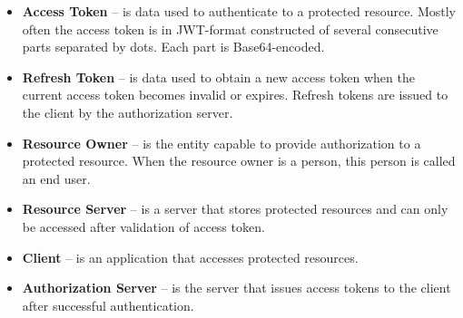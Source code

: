 \begin{itemize}
    \item \textbf{Access Token} -- is data used to authenticate to a protected resource.
    Mostly often the access token is in JWT-format constructed of several
    consecutive parts separated by dots.
    Each part is Base64-encoded.
    \item \textbf{Refresh Token} -- is data used to obtain a new access token when the current access token becomes invalid or expires.
    Refresh tokens are issued to the client by the authorization server.
    \item \textbf{Resource Owner} -- is the entity capable to provide authorization to a protected resource.
    When the resource owner is a person, this person is called an end user.
    \item \textbf{Resource Server} -- is a server that stores protected resources and can only be accessed after validation of access token.
    \item \textbf{Client} -- is an application that accesses protected resources.
    \item \textbf{Authorization Server} -- is the server that issues access tokens to the client after successful authentication.
\end{itemize}